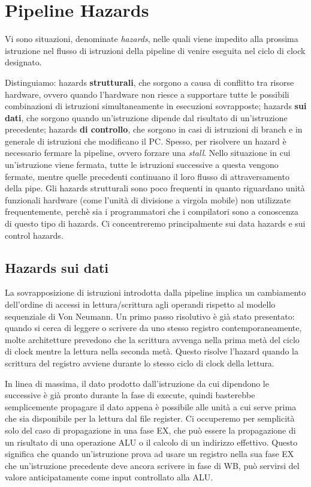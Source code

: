 \section{Pipeline Hazards}
\sloppy
Vi sono situazioni, denominate \textit{hazards}, nelle quali viene impedito alla prossima istruzione nel flusso di istruzioni della pipeline di venire eseguita nel ciclo di clock designato.

Distinguiamo: hazards \textbf{strutturali}, che sorgono a causa di conflitto tra risorse hardware, ovvero quando l'hardware non riesce a supportare tutte le possibili combinazioni di istruzioni simultaneamente in esecuzioni sovrapposte; hazards \textbf{sui dati}, che sorgono quando un'istruzione dipende dal risultato di un'istruzione precedente; hazards \textbf{di controllo}, che sorgono in casi di istruzioni di branch e in generale di istruzioni che modificano il PC. Spesso, per risolvere un hazard è necessario fermare la pipeline, ovvero forzare una \textit{stall}. Nello situazione in cui un'istruzione viene fermata, tutte le istruzioni successive a questa vengono fermate, mentre quelle precedenti continuano il loro flusso di attraversamento della pipe. Gli hazards strutturali sono poco frequenti in quanto riguardano unità funzionali hardware (come l'unità di divisione a virgola mobile) non utilizzate frequentemente, perchè sia i programmatori che i compilatori sono a conoscenza di questo tipo di hazards. Ci concentreremo principalmente sui data hazards e sui control hazards. 

\subsection{Hazards sui dati}
La sovrapposizione di istruzioni introdotta dalla pipeline implica un cambiamento dell'ordine di accessi in lettura/scrittura agli operandi rispetto al modello sequenziale di Von Neumann. Un primo passo risolutivo è già stato presentato: quando si cerca di leggere o scrivere da uno stesso registro contemporaneamente, molte architetture prevedono che la scrittura avvenga nella prima metà del ciclo di clock mentre la lettura nella seconda metà. Questo risolve l'hazard quando la scrittura del registro avviene durante lo stesso ciclo di clock della lettura. 

\noindent In linea di massima, il dato prodotto dall'istruzione da cui dipendono le successive è già pronto durante la fase di execute, quindi basterebbe semplicemente propagare il dato appena è possibile alle unità a cui serve prima che sia disponibile per la lettura dal file register. Ci occuperemo per semplicità solo del caso di propagazione in una fase EX, che può essere la propagazione di un risultato di una operazione ALU o il calcolo di un indirizzo effettivo. Questo significa che quando un'istruzione prova ad usare un registro nella sua fase EX che un'istruzione precedente deve ancora scrivere in fase di WB, può servirsi del valore anticipatamente come input controllato alla ALU.

